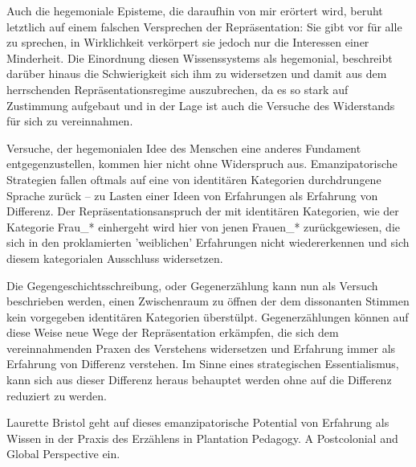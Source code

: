   Auch die hegemoniale Episteme, die daraufhin von
  mir erörtert wird, beruht letztlich auf einem falschen Versprechen der
  Repräsentation: Sie gibt vor für alle zu sprechen,  in Wirklichkeit
  verkörpert sie jedoch nur die Interessen einer Minderheit.  Die Einordnung
  diesen Wissenssystems als hegemonial, beschreibt darüber hinaus die
  Schwierigkeit sich ihm zu widersetzen und damit aus dem herrschenden
  Repräsentationsregime auszubrechen, da es so stark auf  Zustimmung aufgebaut
  und in der Lage ist auch die Versuche des Widerstands für sich zu
  vereinnahmen.

  Versuche, der hegemonialen Idee des  Menschen eine anderes Fundament
  entgegenzustellen,  kommen hier nicht ohne Widerspruch aus. Emanzipatorische
  Strategien fallen oftmals auf eine von identitären Kategorien durchdrungene
  Sprache zurück – zu Lasten einer Ideen von Erfahrungen als Erfahrung von
  Differenz. Der Repräsentationsanspruch der mit identitären Kategorien, wie
  der Kategorie Frau\_* einhergeht wird hier von jenen Frauen\_* zurückgewiesen,
  die sich in den proklamierten 'weiblichen' Erfahrungen nicht wiedererkennen
  und sich diesem kategorialen Ausschluss widersetzen.

  Die Gegengeschichtsschreibung, oder Gegenerzählung kann nun als Versuch
  beschrieben werden, einen Zwischenraum zu öffnen der dem dissonanten Stimmen
  kein vorgegeben identitären Kategorien überstülpt. Gegenerzählungen  können
  auf diese Weise neue Wege der Repräsentation erkämpfen, die sich dem
  vereinnahmenden Praxen des Verstehens widersetzen und Erfahrung immer als
  Erfahrung von Differenz verstehen. Im Sinne eines strategischen
  Essentialismus, kann sich aus dieser Differenz heraus behauptet werden ohne
  auf die Differenz reduziert zu werden.
 
  Laurette Bristol geht auf dieses emanzipatorische Potential von Erfahrung als
  Wissen in der Praxis des Erzählens  in  \glqq Plantation Pedagogy. A Postcolonial
  and Global Perspective \grqq\footnotemark {} ein.

